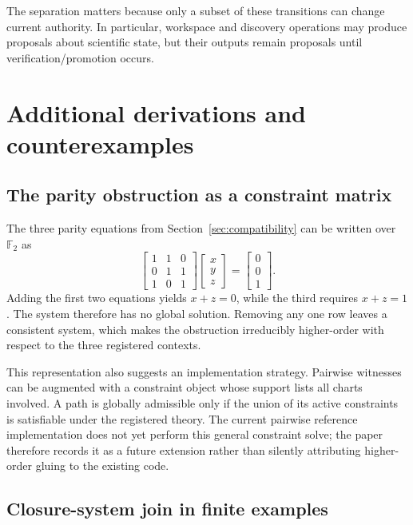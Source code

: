 The separation matters because only a subset of these transitions can change current authority. In particular, workspace and discovery operations may produce proposals about scientific state, but their outputs remain proposals until verification/promotion occurs.

\section{Additional derivations and counterexamples}

\subsection{The parity obstruction as a constraint matrix}

The three parity equations from Section~\ref{sec:compatibility} can be written over \(\mathbb F_2\) as
\[
\begin{bmatrix}
1&1&0\\
0&1&1\\
1&0&1
\end{bmatrix}
\begin{bmatrix}x\\y\\z\end{bmatrix}
=
\begin{bmatrix}0\\0\\1\end{bmatrix}.
\]
Adding the first two equations yields \(x+z=0\), while the third requires \(x+z=1\). The system therefore has no global solution. Removing any one row leaves a consistent system, which makes the obstruction irreducibly higher-order with respect to the three registered contexts.

This representation also suggests an implementation strategy. Pairwise witnesses can be augmented with a constraint object whose support lists all charts involved. A path is globally admissible only if the union of its active constraints is satisfiable under the registered theory. The current pairwise reference implementation does not yet perform this general constraint solve; the paper therefore records it as a future extension rather than silently attributing higher-order gluing to the existing code.

\subsection{Closure-system join in finite examples}

